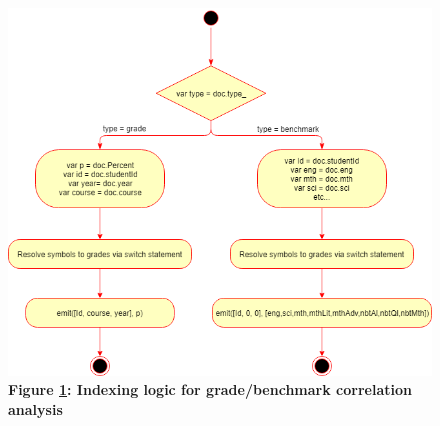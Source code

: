 \begin{figure}[H]
    \centering
    \begin{mdframed}
        \centering
        \includegraphics[scale=0.59]{./resources/figures/fig-mapfn-correlation-grades.png}
    \end{mdframed}
    \caption[Grade/Benchmark correlation map function]{\textbf{Figure \ref{fig-mapfn-correlation-grades}: Indexing logic for grade/benchmark correlation analysis}}
    \label{fig-mapfn-correlation-grades}
\end{figure}
